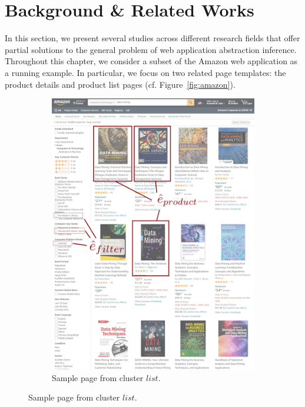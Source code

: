 \section{Background \& Related Works}\label{sec:related}
In this section, we present several studies across different research fields that offer partial solutions to the general problem of web application abstraction inference. 
Throughout this chapter, we consider a subset of the Amazon web application as a running example.
In particular, we focus on two related page templates: the product details and product list pages (cf. Figure~\ref{fig:amazon}).

\begin{figure}[ht]
  \centering
  \begin{subfigure}{.35\textwidth}
    \includegraphics[width=\linewidth]{appstract/amazon_a.png}
    \caption{Sample page from cluster $list$.}
    \label{fig:amazon_a}
  \end{subfigure}
  \hspace{.1\textwidth}

\end{figure}

